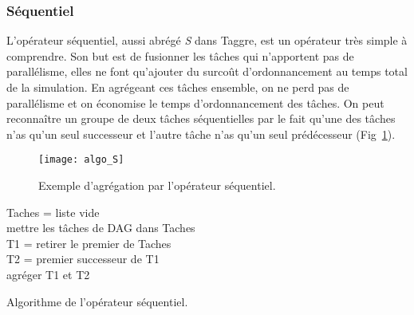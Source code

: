 \subsubsection{Séquentiel}
L'opérateur séquentiel, aussi abrégé {\em S} dans Taggre, est un opérateur très simple à comprendre.
%
Son but est de fusionner les tâches qui n'apportent pas de parallélisme, elles ne font qu'ajouter du surcoût d'ordonnancement au temps total de la simulation.
%
En agrégeant ces tâches ensemble, on ne perd pas de parallélisme et on économise le temps d'ordonnancement des tâches.
%
On peut reconnaître un groupe de deux tâches séquentielles par le fait qu'une des tâches n'as qu'un seul successeur et l'autre tâche n'as qu'un seul prédécesseur (Fig~\ref{fig:algo_S}).


\begin{figure}[t!]
  \centering
  \texttt{[image: algo\_S]}
  \caption{Exemple d'agrégation par l'opérateur séquentiel.}
  \label{fig:algo_S}
\end{figure}

\begin{algorithm}
  {\sc Taches} = liste vide \\
  mettre les tâches de DAG dans {\sc Taches} \\
   {
    {\sc T1} = retirer le premier de {\sc Taches} \\
     {
      {\sc T2} = premier successeur de {\sc T1} \\
       {
        agréger {\sc T1} et {\sc T2}\\
      }
    }
  }
  \caption{Algorithme de l'opérateur séquentiel.}
  \label{algo:algo_S}
\end{algorithm}
